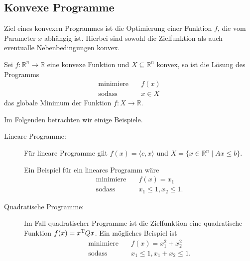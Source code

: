 \subsection{Konvexe Programme}
Ziel eines konvexen Programmes ist die Optimierung einer Funktion $f$, die vom Parameter $x$ abhängig ist. Hierbei sind sowohl die Zielfunktion als auch eventualle Nebenbedingungen konvex.

\begin{Def}
Sei $f: \mathbb{R}^{n} \rightarrow \mathbb{R}$ eine konvexe Funktion und $X \subseteq \mathbb{R}^{n}$ konvex, so ist die Lösung des Programms
\begin{align*}
  \text{minimiere}  \quad& f(x)\\
  \text{sodass} \quad & x\in X
\end{align*}
das globale Minimum der Funktion $f : X\rightarrow \mathbb{R}$.
\end{Def}
\noindent Im Folgenden betrachten wir einige Beispiele.
\medskip

\begin{description}
\item[Lineare Programme:] Für lineare Programme gilt $f(x) = \langle c, x\rangle$ und $X = \{x\in \mathbb{R}^n \mid Ax \leq b\}$.

Ein Beispiel für ein lineares Programm wäre
\begin{align*}
  \text{minimiere}  \quad& f(x) = x_1\\
  \text{sodass} \quad & x_1\leq 1, x_2\leq 1.
\end{align*}

\item[Quadratische Programme:]
Im Fall quadratischer Programme ist die Zielfunktion eine quadratische Funktion $f(x) = x^{\rm T} Q x$. Ein mögliches Beispiel ist
\begin{align*}
  \text{minimiere}  \quad& f(x) = x_1^2 + x_2^2\\
  \text{sodass} \quad & x_1\leq 1, x_1 + x_2\leq 1.
\end{align*}
\end{description}

